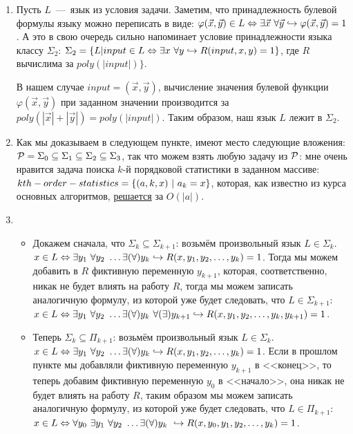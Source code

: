 \documentclass[a4paper,12pt]{article}
\begin{document}
\begin{solution}
	
	\begin{enumerate}
		\item Пусть $L$~---~язык из условия задачи. Заметим, что принадлежность булевой формулы языку можно переписать в виде: $\varphi(\vec{x}, \vec{y}) \in L \LRa \exists \vec{x} \ \forall \vec{y} \vyp \varphi(\vec{x}, \vec{y}) = 1$. А это в свою очередь сильно напоминает условие принадлежности языка классу $\Sigma_2$: $\Sigma_2 \hm{=} \left\{ L | input \in L \LRa \exists x \ \forall y \vyp R(input, x, y) = 1\right\}$, где $R$ вычислима за $poly(|input|)\}$.
		
		В нашем случае $input = (\vec{x}, \vec{y})$, вычисление значения булевой функции $\varphi(\vec{x}, \vec{y})$ при заданном значении производится за $poly(|\vec{x}| + |\vec{y}|) = poly(|input|)$. Таким образом, наш язык $L$ лежит в $\Sigma_2$.
		
		\item Как мы доказываем в следующем пункте, имеют место следующие вложения: $\P = \Sigma_0 \subseteq \Sigma_1 \subseteq \Sigma_2 \subseteq \Sigma_3$, так что можем взять любую задачу из $\P$: мне очень нравится задача поиска $k$-й порядковой статистики в заданном массиве: $kth-order-statistics \hm{=} \{ (a, k, x) \ | \ a_k = x \}$, которая, как известно из курса основных алгоритмов, \href{https://people.csail.mit.edu/rivest/BlumFloydPrattRivestTarjan-TimeBoundsForSelection.pdf}{решается} за $O(|a|)$.
		
		\item
		\begin{itemize}
			\item Докажем сначала, что $\Sigma_k \subseteq \Sigma_{k+1}$: возьмём произвольный язык $L \in \Sigma_k$. $x\in L \LRa \exists y_1 \ \forall y_2 \ \ldots \exists (\forall) y_k \vyp R(x, y_1, y_2, \ldots , y_k) = 1$. Тогда мы можем добавить в $R$ фиктивную переменную $y_{k+1}$, которая, соответственно, никак не будет влиять на работу $R$, тогда мы можем записать аналогичную формулу, из которой уже будет следовать, что $L \in \Sigma_{k+1}$: $x\in L \LRa \exists y_1 \ \forall y_2 \ \ldots \exists (\forall) y_k \ \forall (\exists) y_{k+1} \vyp R(x, y_1, y_2, \ldots , y_k, y_{k+1}) = 1$.
		
			\item Теперь $\Sigma_k \subseteq \Pi_{k+1}$: возьмём произвольный язык $L \in \Sigma_k$. $x\in L \LRa \exists y_1 \ \forall y_2 \ \ldots \exists (\forall) y_k \vyp R(x, y_1, y_2, \ldots , y_k) = 1$. Если в прошлом пункте мы добавляли фиктивную переменную $y_{k+1}$ в <<конец>>, то теперь добавим фиктивную переменную $y_0$ в <<начало>>, она никак не будет влиять на работу $R$, таким образом мы можем записать аналогичную формулу, из которой уже будет следовать, что $L \in \Pi_{k+1}$: $x\in L \LRa \forall y_0 \ \exists y_1 \ \forall y_2 \ \ldots \exists (\forall) y_k \ \vyp R(x, y_0, y_1, y_2, \ldots , y_k) = 1$.
		\end{itemize}
	

\end{enumerate}
\end{solution}
\end{document}
